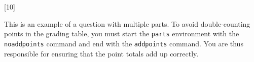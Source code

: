[10]

This is an example of a question with multiple parts. To avoid double-counting
points in the grading table, you must start the \texttt{parts} environment with
the \texttt{noaddpoints} command and end with the \texttt{addpoints} command.
You are thus responsible for ensuring that the point totals add up correctly.

\noaddpoints


\addpoints
